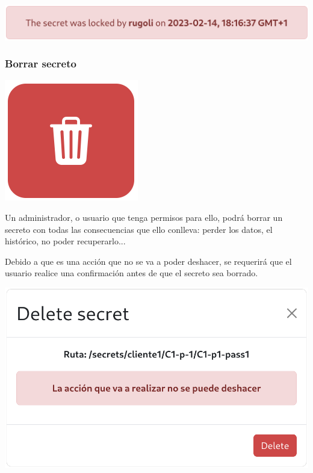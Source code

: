 \documentclass{\ClassPath/viu-tfm-template}
\begin{document}
\begin{center}
    \includegraphics[width=0.8\linewidth]{img/unlock_warning.png}
\end{center}


\subsubsection*{Borrar secreto}
{
\begin{minipage}{0.1\linewidth}
    \includegraphics[width=\linewidth]{img/delete.png}
\end{minipage}
\hspace{0.5cm}
\begin{minipage}{0.9\linewidth}
    Un administrador, o usuario que tenga permisos para ello, podrá borrar un secreto con todas las consecuencias que ello conlleva: perder los datos, el histórico, no poder recuperarlo...
\end{minipage}
}

Debido a que es una acción que no se va a poder deshacer, se requerirá que el usuario realice una confirmación antes de que el secreto sea borrado.

\begin{center}
    \includegraphics[width=0.6\linewidth]{img/delete_warning.png}
\end{center}
\end{document}
